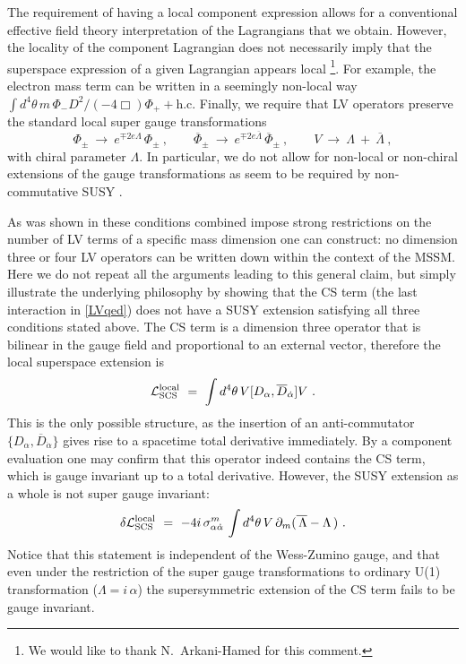 \documentclass[12pt]{revtex4}
\begin{document}
The requirement of having a local component expression allows for a
conventional effective field theory interpretation of the Lagrangians that
we obtain. However, the locality of the component Lagrangian
does not necessarily imply that the superspace
expression of a given Lagrangian appears local 
\footnote{We would like to thank N.\ Arkani-Hamed for this comment.}. 
For example, the electron mass term can be written in a seemingly
non-local way 
%
\(
\int d^4 \theta\, m \, \Phi_- D^2/(- 4\Box) \Phi_+ + \text{h.c.}
\)
%
Finally, we require that LV operators preserve the standard local
super gauge transformations  
%
\begin{equation}
\Phi_\pm ~\rightarrow~ e^{\mp 2 e \Lambda} \, \Phi_\pm~, 
\qquad 
\overline{\Phi}_\pm ~\rightarrow~ e^{\mp 2 e \overline{\Lambda}} \, 
\overline{\Phi}_\pm~, 
\qquad 
V ~\rightarrow~ \Lambda ~+~ \overline{\Lambda}~, 
\label{Gauge}
\end{equation} 
%
with chiral parameter $\Lambda$. In particular, we do not allow for
non-local or non-chiral extensions of the gauge transformations as
seem to be required by non-commutative SUSY
\cite{Putz:2002ib,Mikulovic:2003sq}.  


As was shown in \cite{GrootNibbelink:2004za} these conditions 
combined impose strong restrictions on the number of LV terms of
a specific mass dimension one can construct: no dimension three or four
LV operators can be written down within the context of the MSSM. 
Here we do not repeat all the arguments leading to this general claim,
but simply illustrate the underlying philosophy by showing that the CS
term (the last interaction in \eqref{LVqed}) does not have a SUSY
extension satisfying all three conditions stated above. The CS term is
a dimension three operator that is bilinear in the gauge field and
proportional to an external vector, therefore the local superspace
extension is  
%
\begin{equation}
{\cal L}_{\rm SCS}^{\rm local} ~=~ \int d^4 \theta \, 
V [ D_\alpha, \overline{D}_{\dot\alpha}] V~.
\label{locCS}
\end{equation} 
%
This is the only possible structure, as the insertion of an anti-commutator 
$\{D_\alpha, \overline{D}_{\dot\alpha}\}$ gives rise to a spacetime
total derivative immediately. By a component evaluation one may
confirm that this operator indeed contains the CS term, which 
is gauge invariant up to a total derivative. However, the
SUSY extension as a whole is not super gauge invariant: 
%
\begin{equation}
\delta {\cal L}_{\rm SCS}^{\rm local} 
~=~ - 4 i\, \sigma_{\alpha\dot{\alpha}}^m\, 
\int d^4 \theta \, 
V\, \partial_m ( \overline{\, \Lambda} - \Lambda \,)~. 
\label{locCStrans} 
\end{equation} 
%
Notice that this statement is independent of the Wess-Zumino
gauge, and that even under the restriction of  the super gauge
transformations to ordinary U(1) transformation 
($\Lambda = i \,\alpha$) the supersymmetric extension of the CS term
fails to be gauge invariant.  
\end{document}
